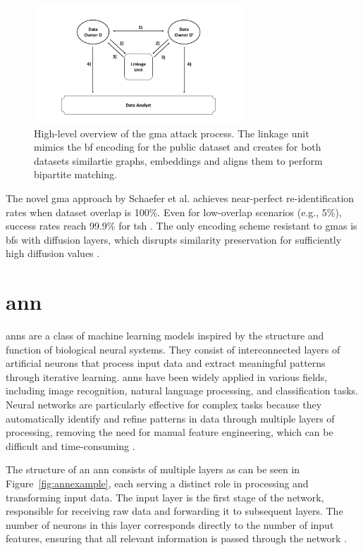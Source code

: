 \begin{figure}[H]
  \centering
  \includegraphics[width=0.7\textwidth, page=11]{img/visualization.pdf}
  \caption{High-level overview of the \ac{gma} attack process.
  The linkage unit mimics the \ac{bf} encoding for the public dataset and creates for both datasets similartie graphs, embeddings and aligns them to perform bipartite matching.}
  \label{fig:gmaexampletwo}
\end{figure}

The novel \ac{gma} approach by Schaefer et al. \cite{schaefer2024} achieves near-perfect re-identification rates when dataset overlap is 100\%.
Even for low-overlap scenarios (e.g., 5\%), success rates reach 99.9\% for \ac{tsh} \cite{schaefer2024}.
The only encoding scheme resistant to \ac{gma}s is \ac{bf}s with diffusion layers, which disrupts similarity preservation for sufficiently high diffusion values \cite{schaefer2024}.


\section{\ac{ann}} \label{sec:nn}

\ac{ann}s are a class of machine learning models inspired by the structure and function of biological neural systems.
They consist of interconnected layers of artificial neurons that process input data and extract meaningful patterns through iterative learning.
\ac{ann}s have been widely applied in various fields, including image recognition, natural language processing, and classification tasks.
Neural networks are particularly effective for complex tasks because they automatically identify and refine patterns in data through multiple layers of processing, removing the need for manual feature engineering, which can be difficult and time-consuming \cite{dongare2012introduction}.

The structure of an \ac{ann} consists of multiple layers as can be seen in Figure~\ref{fig:annexample}, each serving a distinct role in processing and transforming input data.
The input layer is the first stage of the network, responsible for receiving raw data and forwarding it to subsequent layers.
The number of neurons in this layer corresponds directly to the number of input features, ensuring that all relevant information is passed through the network \cite{dongare2012introduction}.

